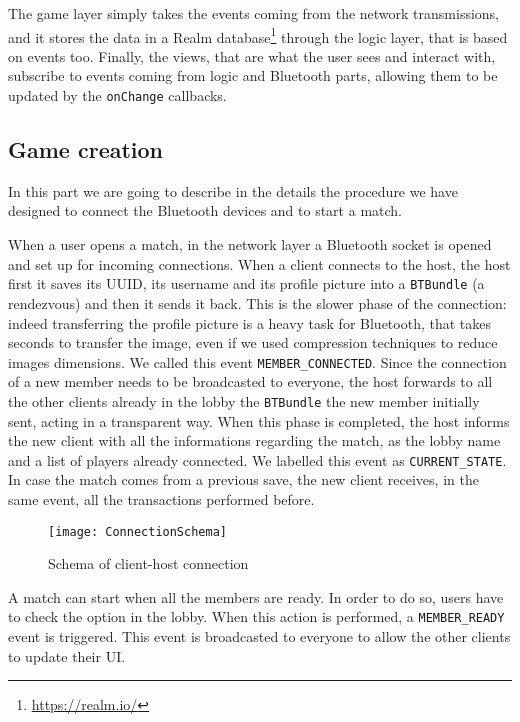 The game layer simply takes the events coming from the network transmissions, 
and it stores the data in a Realm database\footnote{\url{https://realm.io/}} 
through the logic layer, that is based on events too. Finally, the views, that 
are what the user sees and interact with, subscribe to events coming from logic 
and Bluetooth parts, allowing them to be updated by the \texttt{onChange} 
callbacks.

\subsection{Game creation}

In this part we are going to describe in the details the procedure we have 
designed to connect the Bluetooth devices and to start a match.

When a user opens a match, in the network layer a Bluetooth socket is opened 
and set up for incoming connections. When a client connects to the host, the 
host first it saves its UUID, its username and its profile picture into a 
\texttt{BTBundle} (a rendezvous) and then it sends it back.
This is the slower phase of the connection: indeed transferring the profile 
picture is a heavy task for Bluetooth, that takes seconds to transfer the image, 
even if we used compression techniques to reduce images dimensions. We called 
this event \texttt{MEMBER\_CONNECTED}. Since the connection of a new member 
needs to be broadcasted to everyone, the host forwards to all the other clients 
already in the lobby the \texttt{BTBundle} the new member initially sent, acting 
in a transparent way. When this phase is completed, the host informs the new 
client with all the informations regarding the match, as the lobby name and a 
list of players already connected. We labelled this event as 
\texttt{CURRENT\_STATE}. In case the match comes from a previous save, the new 
client receives, in the same event, all the transactions performed before.

\begin{figure}[t]
 \centering
 \texttt{[image: ConnectionSchema]}
 \caption{Schema of client-host connection}
 \label{fig:gbConnectionSchema}
\end{figure}

A match can start when all the members are ready. In order to do so, users have 
to check the option in the lobby. When this action is performed, a 
\texttt{MEMBER\_READY} event is triggered. This event is broadcasted to everyone 
to allow the other clients to update their UI.


